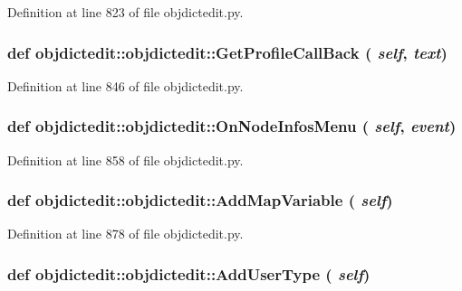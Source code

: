 Definition at line 823 of file objdictedit.py.\hypertarget{classobjdictedit_1_1objdictedit_5c7d639d93865513d3d469703fe19816}{
\subsubsection[GetProfileCallBack]{\setlength{\rightskip}{0pt plus 5cm}def objdictedit::objdictedit::Get\-Profile\-Call\-Back ( {\em self},  {\em text})}}
\label{classobjdictedit_1_1objdictedit_5c7d639d93865513d3d469703fe19816}




Definition at line 846 of file objdictedit.py.\hypertarget{classobjdictedit_1_1objdictedit_3bc819e548d22a2487aa70a0f3e6cbb4}{
\subsubsection[OnNodeInfosMenu]{\setlength{\rightskip}{0pt plus 5cm}def objdictedit::objdictedit::On\-Node\-Infos\-Menu ( {\em self},  {\em event})}}
\label{classobjdictedit_1_1objdictedit_3bc819e548d22a2487aa70a0f3e6cbb4}




Definition at line 858 of file objdictedit.py.\hypertarget{classobjdictedit_1_1objdictedit_d320c07fd4feab969b9454d49ab0ef5a}{
\subsubsection[AddMapVariable]{\setlength{\rightskip}{0pt plus 5cm}def objdictedit::objdictedit::Add\-Map\-Variable ( {\em self})}}
\label{classobjdictedit_1_1objdictedit_d320c07fd4feab969b9454d49ab0ef5a}




Definition at line 878 of file objdictedit.py.\hypertarget{classobjdictedit_1_1objdictedit_704a2250995855aaabdd9e024e98a1ca}{
\subsubsection[AddUserType]{\setlength{\rightskip}{0pt plus 5cm}def objdictedit::objdictedit::Add\-User\-Type ( {\em self})}}
\label{classobjdictedit_1_1objdictedit_704a2250995855aaabdd9e024e98a1ca}




